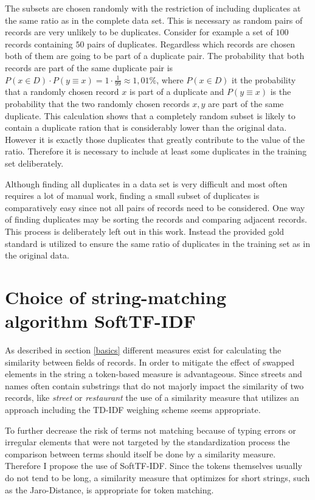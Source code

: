 \documentclass[conference]{IEEEtran}
\begin{document}
The subsets are chosen randomly with the restriction of including duplicates at the same ratio as in the complete data set. This is necessary as random pairs of records are very unlikely to be duplicates. Consider for example a set of $100$ records containing $50$ pairs of duplicates. Regardless which records are chosen both of them are going to be part of a duplicate pair. The probability that both records are part of the same duplicate pair is $P(x \in D) \cdot P(y \equiv x) = 1 \cdot \frac{1}{99} \approx 1,01\%$, where $P(x \in D)$ it the probability that a randomly chosen record $x$ is part of a duplicate and $P(y \equiv x)$ is the probability that the two randomly chosen records $x,y$ are part of the same duplicate. This calculation shows that a completely random subset is likely to contain a duplicate ration that is considerably lower than the original data. However it is exactly those duplicates that greatly contribute to the value of the ratio.
Therefore it is necessary to include at least some duplicates in the training set deliberately.

Although finding all duplicates in a data set is very difficult and most often requires a lot of manual work, finding a small subset of duplicates is comparatively easy since not all pairs of records need to be considered. One way of finding duplicates may be sorting the records and comparing adjacent records. This process is deliberately left out in this work. Instead the provided gold standard is utilized to ensure the same ratio of duplicates in the training set as in the original data.


\section{Choice of string-matching algorithm SoftTF-IDF}\label{matching}
As described in section \ref{basics} different measures exist for calculating the similarity between fields of records. In order to mitigate the effect of swapped elements in the string a token-based measure is advantageous.
Since streets and names often contain substrings that do not majorly impact the similarity of two records, like \emph{street} or \emph{restaurant} the use of a similarity measure that utilizes an approach including the TD-IDF weighing scheme seems appropriate.

To further decrease the risk of terms not matching because of typing errors or irregular elements that were not targeted by the standardization process the comparison between terms should itself be done by a similarity measure. Therefore I propose the use of SoftTF-IDF. Since the tokens themselves usually do not tend to be long, a similarity measure that optimizes for short strings, such as the Jaro-Distance, is appropriate for token matching.
\end{document}
